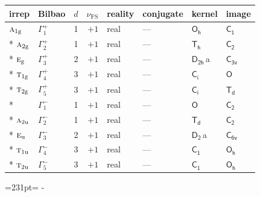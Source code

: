 \documentclass[10pt,a4paper]{article}
\newcommand{\needspace}[1]{\par\penalty-100\begingroup\dimen0=#1\relax\dimen2=\pagegoal
  \advance\dimen2-\pagetotal\ifdim\dimen0>\dimen2\relax\ifdim\dimen2>0pt\vfil\break\fi\fi
  \endgroup}
\numberwithin{equation}{section}
\newcommand{\grp}[1]{\mathsf{#1}}
\newcommand{\irr}[1]{\text{\normalfont\scshape #1}}
\newcommand{\detbox}[1]{{\setlength{\fboxsep}{1pt}\fbox{#1}}}
\newcommand{\ptag}[1]{\mathrm{#1}}
\newcommand{\clsletter}[1]{\,{\scriptsize\color{black!55}#1}}
\newcommand{\fsind}{\nu_{\mathrm{FS}}}
\begin{document}
{\small\renewcommand{\arraystretch}{1.25}\begin{longtable}{@{}llrrllll@{}}\toprule
irrep & Bilbao & $d$ & $\fsind$ & reality & conjugate & kernel & image\\\midrule\endhead
\bottomrule\endfoot\endlastfoot
$\irr{a}_{1\ptag{g}}$ & $\Gamma_{1}^{+}$ & 1 & $+1$ & real & --- & \href{Oh.pdf}{$\grp{O_{h}}$} & \href{C1.pdf}{$\grp{C_{1}}$}\\*
$\irr{a}_{2\ptag{g}}$ & $\Gamma_{2}^{+}$ & 1 & $+1$ & real & --- & \href{Th.pdf}{$\grp{T_{h}}$} & \href{C2.pdf}{$\grp{C_{2}}$}\\*
$\irr{e}_{\ptag{g}}$ & $\Gamma_{3}^{+}$ & 2 & $+1$ & real & --- & \href{D2h.pdf}{$\grp{D_{2h}}$}\clsletter{a} & \href{C3v.pdf}{$\grp{C_{3v}}$}\\*
$\irr{t}_{1\ptag{g}}$ & $\Gamma_{4}^{+}$ & 3 & $+1$ & real & --- & \href{S2.pdf}{$\grp{C_{i}}$} & \href{O.pdf}{$\grp{O}$}\\*
$\irr{t}_{2\ptag{g}}$ & $\Gamma_{5}^{+}$ & 3 & $+1$ & real & --- & \href{S2.pdf}{$\grp{C_{i}}$} & \href{Td.pdf}{$\grp{T_{d}}$}\\*
\detbox{$\irr{a}_{1\ptag{u}}$} & $\Gamma_{1}^{-}$ & 1 & $+1$ & real & --- & \href{O.pdf}{$\grp{O}$} & \href{C2.pdf}{$\grp{C_{2}}$}\\*
$\irr{a}_{2\ptag{u}}$ & $\Gamma_{2}^{-}$ & 1 & $+1$ & real & --- & \href{Td.pdf}{$\grp{T_{d}}$} & \href{C2.pdf}{$\grp{C_{2}}$}\\*
$\irr{e}_{\ptag{u}}$ & $\Gamma_{3}^{-}$ & 2 & $+1$ & real & --- & \href{D2.pdf}{$\grp{D_{2}}$}\clsletter{a} & \href{C6v.pdf}{$\grp{C_{6v}}$}\\*
$\irr{t}_{1\ptag{u}}$ & $\Gamma_{4}^{-}$ & 3 & $+1$ & real & --- & \href{C1.pdf}{$\grp{C_{1}}$} & \href{Oh.pdf}{$\grp{O_{h}}$}\\*
$\irr{t}_{2\ptag{u}}$ & $\Gamma_{5}^{-}$ & 3 & $+1$ & real & --- & \href{C1.pdf}{$\grp{C_{1}}$} & \href{Oh.pdf}{$\grp{O_{h}}$}\\
\bottomrule\end{longtable}}
\needspace{231pt}
\end{document}
